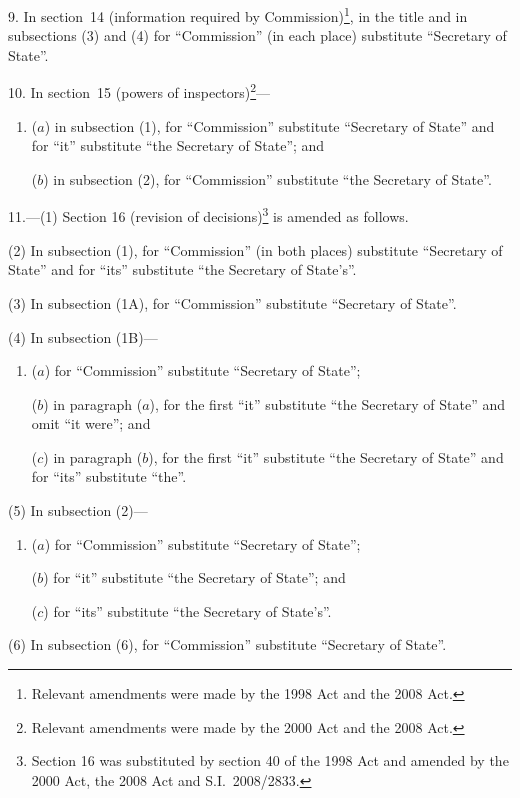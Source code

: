 \documentclass[12pt,a4paper]{article}
\begin{document}
9.  In section~14 (information required by Commission)\footnote{Relevant amendments were made by the 1998 Act and the 2008 Act.}, in the title and in subsections (3) and (4) for “Commission” (in each place) substitute “Secretary of State”.

\medskip

10.  In section~15 (powers of inspectors)\footnote{Relevant amendments were made by the 2000 Act and the 2008 Act.}—
\begin{enumerate}\item[]
($a$) in subsection (1), for “Commission” substitute “Secretary of State” and for “it” substitute “the Secretary of State”; and

($b$) in subsection (2), for “Commission” substitute “the Secretary of State”.
\end{enumerate}

\medskip

11.---(1)  Section 16 (revision of decisions)\footnote{Section 16 was substituted by section 40 of the 1998 Act and amended by the 2000 Act, the 2008 Act and S.I.~2008/2833.} is amended as follows.

(2) In subsection (1), for “Commission” (in both places) substitute “Secretary of State” and for “its” substitute “the Secretary of State’s”.

(3) In subsection (1A), for “Commission” substitute “Secretary of State”.

(4) In subsection (1B)—
\begin{enumerate}\item[]
($a$) for “Commission” substitute “Secretary of State”;

($b$) in paragraph ($a$), for the first “it” substitute “the Secretary of State” and omit “it were”; and

($c$) in paragraph ($b$), for the first “it” substitute “the Secretary of State” and for “its” substitute “the”.
\end{enumerate}

(5) In subsection (2)—
\begin{enumerate}\item[]
($a$) for “Commission” substitute “Secretary of State”;

($b$) for “it” substitute “the Secretary of State”; and

($c$) for “its” substitute “the Secretary of State’s”.
\end{enumerate}

(6) In subsection (6), for “Commission” substitute “Secretary of State”.
\end{document}
